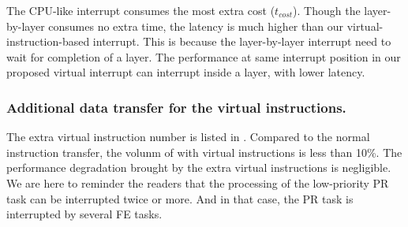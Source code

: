 
The CPU-like interrupt consumes the most extra cost ($t_{cost}$). Though the layer-by-layer consumes no extra time, the latency is much higher than our virtual-instruction-based interrupt. 
This is because the layer-by-layer interrupt need to wait for completion of a layer. The performance at same interrupt position in our proposed virtual interrupt can interrupt inside a layer, with lower latency.


\subsubsection{ Additional data transfer for the virtual instructions. }

The extra virtual instruction number is listed in . Compared to the normal instruction transfer, the volunm of with virtual instructions is less than 10\%. The performance degradation brought by the extra virtual instructions is negligible. 
We are here to reminder the readers that the processing of the low-priority PR task can be interrupted twice or more. And in that case, the PR task is interrupted by several FE tasks.



